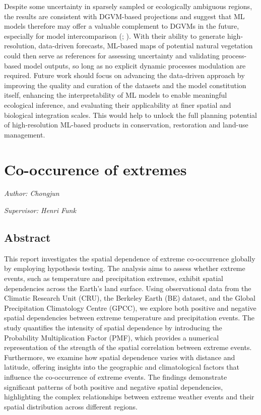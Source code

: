 \documentclass[
]{krantz}
\begin{document}
Despite some uncertainty in sparsely sampled or ecologically ambiguous regions, the results are consistent with DGVM-based projections and suggest that ML models therefore may offer a valuable complement to DGVMs in the future, especially for model intercomparison (\citet{hickler2012}; \citet{sato2022}). With their ability to generate high-resolution, data-driven forecasts, ML-based maps of potential natural vegetation could then serve as references for assessing uncertainty and validating process-based model outputs, so long as no explicit dynamic processes modulation are required. Future work should focus on advancing the data-driven approach by improving the quality and curation of the datasets and the model constitution itself, enhancing the interpretability of ML models to enable meaningful ecological inference, and evaluating their applicability at finer spatial and biological integration scales. This would help to unlock the full planning potential of high-resolution ML-based products in conservation, restoration and land-use management.

\chapter{Co-occurence of extremes}\label{co-occurence-of-extremes}

\emph{Author: Chongjun }

\emph{Supervisor: Henri Funk}

\section{Abstract}\label{abstract-5}

This report investigates the spatial dependence of extreme co-occurrence globally by employing hypothesis testing. The analysis aims to assess whether extreme events, such as temperature and precipitation extremes, exhibit spatial dependencies across the Earth's land surface. Using observational data from the Climatic Research Unit (CRU), the Berkeley Earth (BE) dataset, and the Global Precipitation Climatology Centre (GPCC), we explore both positive and negative spatial dependencies between extreme temperature and precipitation events. The study quantifies the intensity of spatial dependence by introducing the Probability Multiplication Factor (PMF), which provides a numerical representation of the strength of the spatial correlation between extreme events. Furthermore, we examine how spatial dependence varies with distance and latitude, offering insights into the geographic and climatological factors that influence the co-occurrence of extreme events. The findings demonstrate significant patterns of both positive and negative spatial dependencies, highlighting the complex relationships between extreme weather events and their spatial distribution across different regions.
\end{document}
